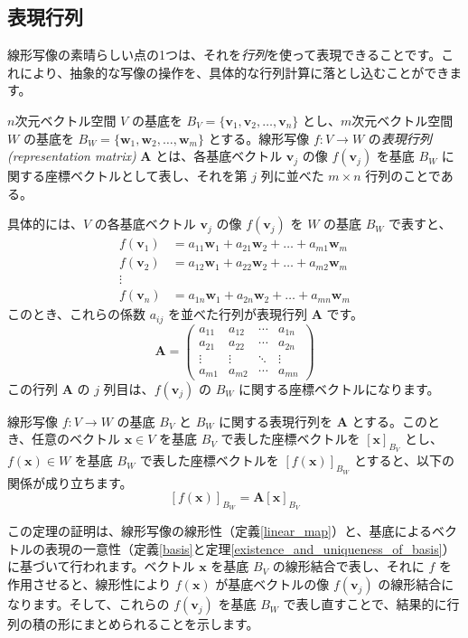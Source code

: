 \subsection{表現行列}

線形写像の素晴らしい点の1つは、それを\emph{行列}を使って表現できることです。これにより、抽象的な写像の操作を、具体的な行列計算に落とし込むことができます。

\begin{dfn}[表現行列] \label{representation_matrix}
$n$次元ベクトル空間 $V$ の基底を $B_V = \{\bm{v}_1, \bm{v}_2, \ldots, \bm{v}_n\}$ とし、$m$次元ベクトル空間 $W$ の基底を $B_W = \{\bm{w}_1, \bm{w}_2, \ldots, \bm{w}_m\}$ とする。線形写像 $f: V \to W$ の\emph{表現行列 (representation matrix)} $\bm{A}$ とは、各基底ベクトル $\bm{v}_j$ の像 $f(\bm{v}_j)$ を基底 $B_W$ に関する座標ベクトルとして表し、それを第 $j$ 列に並べた $m \times n$ 行列のことである。
\end{dfn}

具体的には、$V$ の各基底ベクトル $\bm{v}_j$ の像 $f(\bm{v}_j)$ を $W$ の基底 $B_W$ で表すと、
\begin{align*}
f(\bm{v}_1) &= a_{11}\bm{w}_1 + a_{21}\bm{w}_2 + \dots + a_{m1}\bm{w}_m\\
f(\bm{v}_2) &= a_{12}\bm{w}_1 + a_{22}\bm{w}_2 + \dots + a_{m2}\bm{w}_m\\
\vdots \\
f(\bm{v}_n) &= a_{1n}\bm{w}_1 + a_{2n}\bm{w}_2 + \dots + a_{mn}\bm{w}_m
\end{align*}
このとき、これらの係数 $a_{ij}$ を並べた行列が表現行列 $\bm{A}$ です。
\[
\bm{A} = \begin{pmatrix}
a_{11} & a_{12} & \cdots & a_{1n} \\
a_{21} & a_{22} & \cdots & a_{2n} \\
\vdots & \vdots & \ddots & \vdots \\
a_{m1} & a_{m2} & \cdots & a_{mn}
\end{pmatrix}
\]
この行列 $\bm{A}$ の $j$ 列目は、$f(\bm{v}_j)$ の $B_W$ に関する座標ベクトルになります。

\begin{thm}[線形写像の行列による表現] \label{matrix_representation_of_linear_map}
線形写像 $f: V \to W$ の基底 $B_V$ と $B_W$ に関する表現行列を $\bm{A}$ とする。このとき、任意のベクトル $\bm{x} \in V$ を基底 $B_V$ で表した座標ベクトルを $[\bm{x}]_{B_V}$ とし、$f(\bm{x}) \in W$ を基底 $B_W$ で表した座標ベクトルを $[f(\bm{x})]_{B_W}$ とすると、以下の関係が成り立ちます。
\[[f(\bm{x})]_{B_W} = \bm{A} [\bm{x}]_{B_V}\]
\begin{proof*}[アイデア]
この定理の証明は、線形写像の線形性（定義\ref{linear_map}）と、基底によるベクトルの表現の一意性（定義\ref{basis}と定理\ref{existence_and_uniqueness_of_basis}）に基づいて行われます。ベクトル $\bm{x}$ を基底 $B_V$ の線形結合で表し、それに $f$ を作用させると、線形性により $f(\bm{x})$ が基底ベクトルの像 $f(\bm{v}_j)$ の線形結合になります。そして、これらの $f(\bm{v}_j)$ を基底 $B_W$ で表し直すことで、結果的に行列の積の形にまとめられることを示します。
\end{proof*}
\end{thm}

